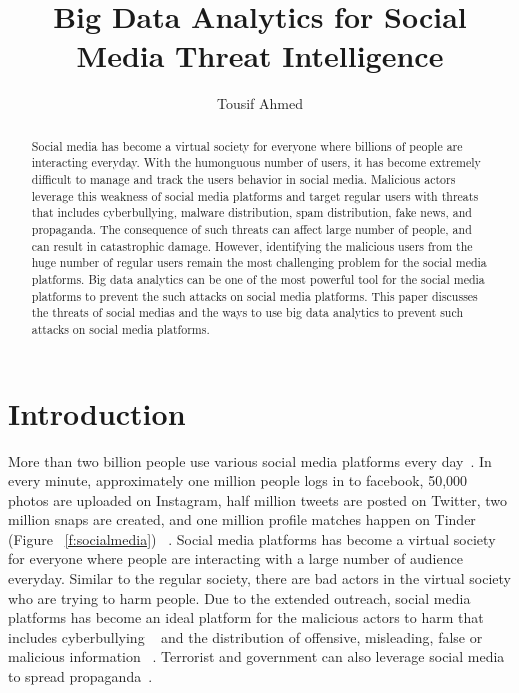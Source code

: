 \documentclass[sigconf]{acmart}
\begin{document}
\title{Big Data Analytics for Social Media Threat Intelligence}


\author{Tousif Ahmed}



\begin{abstract}
Social media has become a virtual society for everyone where billions of people are  interacting  everyday. With the humonguous number of users, it has become extremely difficult to manage and track the users behavior in social media.  Malicious actors leverage this weakness of social media platforms and target regular users with threats that includes cyberbullying, malware distribution, spam distribution, fake news, and propaganda.  The consequence of such threats can  affect large number of people, and can result in catastrophic damage. However, identifying the malicious users from the huge number of regular users remain the most challenging problem for the social media platforms. Big data analytics can be one of the most powerful tool  for the social media platforms to prevent the such attacks on social media platforms. This paper discusses the threats of social medias and the ways to use big data analytics to prevent such attacks on social media platforms. 

\end{abstract}



\maketitle



\section{Introduction}
More than two billion people use various social media platforms every day~\cite{social-media}. In every minute, approximately one million people logs in to facebook, 50,000 photos are uploaded on Instagram, half million tweets are posted on Twitter, two million snaps are created, and one million profile matches happen on Tinder (Figure ~\ref{f:socialmedia}) ~\cite{social-media2}. Social media platforms has become a virtual society for everyone where people are interacting with a large number of audience everyday. Similar to the regular society, there are bad actors in the virtual society who are trying to harm people. Due to the extended outreach, social media platforms has become an ideal platform for the malicious actors to harm that includes cyberbullying ~\cite{Slonje:2013,Kwan:2013,Singh:2017,Cheng:2017,HosseinmardiMRH15} and the distribution of offensive, misleading, false or malicious information ~\cite{Menczer:2016, socialbots-CACM, Shao15hoaxy, Shao17hoaxybots}. Terrorist and government can also leverage social media to spread propaganda~\cite{Aro2016,Weimann:2006}.
\end{document}
